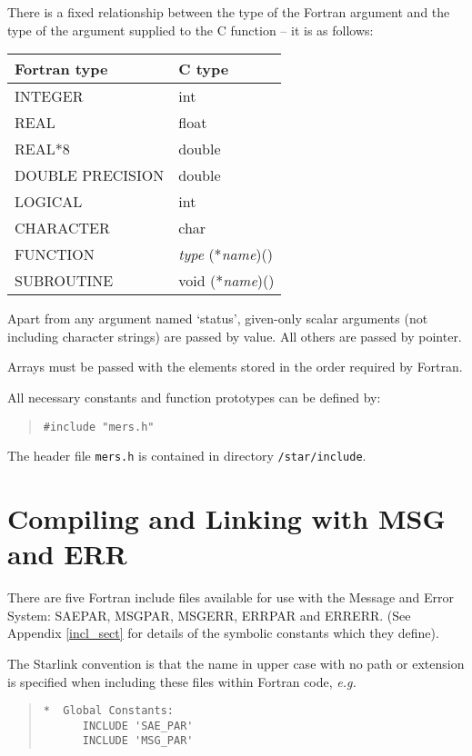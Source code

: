 \documentclass[twoside,11pt]{article}
\newcommand{\htmlref}[2]{#1}
\newcommand{\latex}[1]{#1}
\newcommand{\xlabel}[1]{}
\renewcommand{\_}{\texttt{\symbol{95}}}
\begin{document}
There is a fixed relationship between the type of the Fortran
argument and the type of the argument supplied to the C function -- it is
as follows:
\begin{center}
\begin{tabular}{|l|l|}
\hline
Fortran type & C type \\
\hline
INTEGER & int \\
REAL & float \\
REAL*8 & double \\
DOUBLE PRECISION & double \\
LOGICAL & int \\
CHARACTER & char \\
FUNCTION & \textit{type} (*\textit{name})() \\
SUBROUTINE & void (*\textit{name})() \\
\hline
\end{tabular}
\end{center}

Apart from any argument named `status', given-only scalar arguments (not
including character strings) are passed by value.
All others are passed by pointer.

Arrays must be passed with the elements stored in the order required by Fortran.

All necessary constants and function prototypes can be defined by:
\begin{quote} \begin{verbatim}
#include "mers.h"
\end{verbatim} \end{quote}
The header file \texttt{mers.h} is contained in directory
\texttt{/star/include}.

\section{\xlabel{compiling_and_linking_with_msg_and_err}Compiling and Linking with MSG and ERR
\label{compiling_and_linking}\xlabel{compiling_and_linking}}
There are five Fortran include files available for use with the Message and
Error System:
\htmlref{SAE\_PAR, MSG\_PAR, MSG\_ERR, ERR\_PAR and ERR\_ERR}{incl_sect}.
\latex{(See Appendix \ref{incl_sect} for details of the symbolic constants
which they define).}

The Starlink convention
is that the name in upper case with no path or extension is specified when
including these files within Fortran code,
\textit{e.g.}
\begin{quote}
\begin{small}
\begin{verbatim}
*  Global Constants:
      INCLUDE 'SAE_PAR'
      INCLUDE 'MSG_PAR'
\end{verbatim}
\end{small}
\end{quote}
\end{document}
